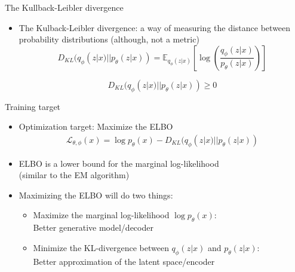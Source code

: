 \documentclass[10pt]{beamer}
\begin{document}
\begin{frame}{The Kullback-Leibler divergence}

\begin{itemize}
\item {\color{uured} The Kulback-Leibler divergence}: a way of measuring the distance between probability distributions (although, not a metric)
\[
D_{KL}(q_\phi(z|x)||p_\theta(z|x)) = \mathbb{E}_{q_\phi(z|x)}\left[\log \left(\frac{q_\phi(z|x)}{p_\theta(z|x)}\right)\right]
\]

\[
D_{KL}(q_\phi(z|x)||p_\theta(z|x)) \geq 0
\]
\end{itemize}

\end{frame}


\begin{frame}{Training target}

\begin{itemize}
\item Optimization target: Maximize the ELBO
\begin{align*}
\mathcal{L}_{\theta,\phi}(x) = \log p_\theta(x) - D_{KL}(q_\phi(z|x)||p_\theta(z|x))
\end{align*}
\item ELBO is a lower bound for the marginal log-likelihood\\ (similar to the EM algorithm)
\pause
\item Maximizing the ELBO will do two things:
\begin{itemize}
\item Maximize the marginal log-likelihood $\log p_\theta(x)$:\\Better generative model/decoder
\item Minimize the KL-divergence between $q_\phi(z|x)$ and $p_\theta(z|x)$:\\Better approximation of the latent space/encoder
\end{itemize}
\end{itemize}

\end{frame}
\end{document}
